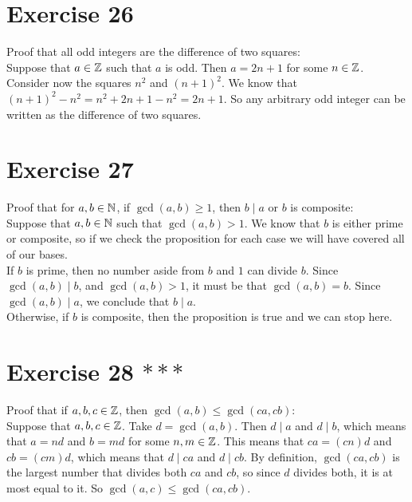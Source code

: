 \documentclass[12pt]{article}
\begin{document}
    \section*{Exercise 26}
    Proof that all odd integers are the difference of two squares: \\
    Suppose that $a \in \mathbb{Z}$
    such that $a$ is odd.
    Then $a = 2n+1$ for some $n \in \mathbb{Z}$.
    Consider now the squares $n^2$ and $(n+1)^2$.
    We know that $(n+1)^2 - n^2 = n^2 + 2n + 1 - n^2 = 2n+1$.
    So any arbitrary odd integer can be written
    as the difference of two squares. \\

    \section*{Exercise 27}
    Proof that for $a, b \in \mathbb{N}$,
    if $\gcd(a, b) \geqslant 1$,
    then $b \mid a$ or $b$ is composite: \\
    Suppose that $a, b \in \mathbb{N}$
    such that $\gcd(a, b) > 1$.
    We know that $b$ is either prime or composite,
    so if we check the proposition for each case
    we will have covered all of our bases. \\
    If $b$ is prime,
    then no number aside from $b$ and $1$ can divide $b$.
    Since $\gcd(a, b) \mid b$,
    and $\gcd(a, b) > 1$,
    it must be that $\gcd(a, b) = b$.
    Since $\gcd(a, b) \mid a$,
    we conclude that $b \mid a$. \\
    Otherwise, if $b$ is composite,
    then the proposition is true and we can stop here. \\

    \section*{Exercise 28 $***$}
    Proof that if $a, b, c \in \mathbb{Z}$,
    then $\gcd(a, b) \leqslant \gcd(ca, cb)$: \\
    Suppose that $a, b, c \in \mathbb{Z}$.
    Take $d = \gcd(a, b)$.
    Then $d \mid a$ and $d \mid b$,
    which means that $a = nd$ and $b = md$
    for some $n, m \in \mathbb{Z}$.
    This means that $ca = (cn)d$ and $cb = (cm)d$,
    which means that $d \mid ca$ and $d \mid cb$.
    By definition,
    $\gcd(ca, cb)$
    is the largest number that divides both $ca$ and $cb$,
    so since $d$ divides both,
    it is at most equal to it.
    So $\gcd(a, c) \leqslant \gcd(ca, cb)$. \\
\end{document}

